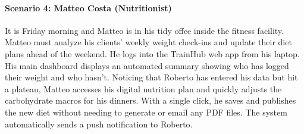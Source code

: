 \paragraph{Scenario 4: Matteo Costa (Nutritionist)}It is Friday morning and Matteo is in his tidy offce inside the fitness facility. Matteo must analyze his clients' weekly weight check-ins and update their diet plans ahead of the weekend.
He logs into the TrainHub web app from his laptop. His main dashboard displays an automated summary showing who has logged their weight and who hasn't. Noticing that Roberto has entered his data but hit a plateau, Matteo accesses his digital nutrition plan and quickly adjusts the carbohydrate macros for his dinners. With a single click, he saves and publishes the new diet without needing to generate or email any PDF files. The system automatically sends a push notification to Roberto.